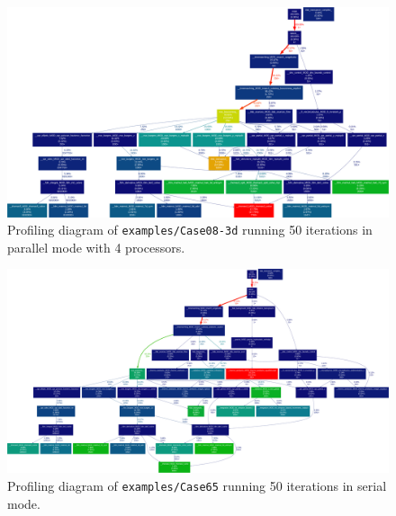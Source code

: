 
\begin{figure}[!h]
  \centering
  \includegraphics[clip,width=\textwidth]{fig-profiling08-3d-mpi.pdf}
  \caption{Profiling diagram of \texttt{examples/Case08-3d} running 50 iterations in parallel mode with 4 processors.}
\end{figure}

\newpage

\begin{figure}[!h]
  \centering
  \includegraphics[clip,width=\textwidth]{fig-profiling65.pdf}
  \caption{Profiling diagram of \texttt{examples/Case65} running 50 iterations in serial mode.}
\end{figure}

